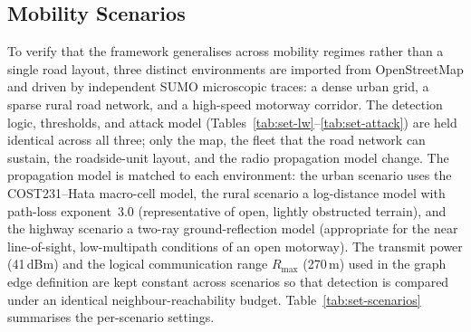 \documentclass[12pt, a4paper]{report}
\begin{document}
\subsection{Mobility Scenarios}
\label{sec:mobility-scenarios}

To verify that the framework generalises across mobility regimes rather than a
single road layout, three distinct environments are imported from OpenStreetMap
and driven by independent SUMO microscopic traces: a dense urban grid, a sparse
rural road network, and a high-speed motorway corridor. The detection logic,
thresholds, and attack model (Tables~\ref{tab:set-lw}--\ref{tab:set-attack}) are
held identical across all three; only the map, the fleet that the road network
can sustain, the roadside-unit layout, and the radio propagation model change.
The propagation model is matched to each environment: the urban scenario uses the
COST231--Hata macro-cell model, the rural scenario a log-distance model with
path-loss exponent~3.0 (representative of open, lightly obstructed terrain), and
the highway scenario a two-ray ground-reflection model (appropriate for the
near line-of-sight, low-multipath conditions of an open motorway). The transmit
power (41\,dBm) and the logical communication range $R_{\max}$ (270\,m) used in
the graph edge definition are kept constant across scenarios so that detection is
compared under an identical neighbour-reachability budget. Table~\ref{tab:set-scenarios}
summarises the per-scenario settings.
\end{document}

